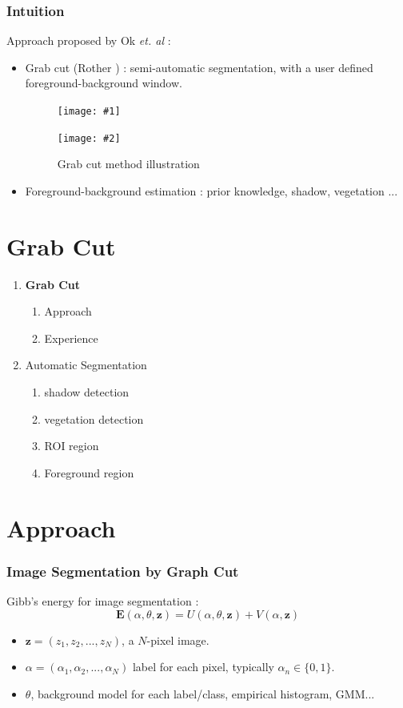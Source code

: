 \documentclass[compress]{beamer} %
\newcommand{\insertTwoF}[4]{
  \begin{figure}[h!]
    \centering
    \begin{minipage}{#4\linewidth}
    \texttt{[image: \#1]}
    \end{minipage}
    \begin{minipage}{#4\linewidth}
    \texttt{[image: \#2]}
    \end{minipage}
      \caption{#3}
  \end{figure}  
}
\newcommand{\bfE}{\mathbf{E}}
\newcommand{\bfz}{\mathbf{z}}
\begin{document}
 \begin{frame}
  \frametitle{Intuition}
  Approach proposed by Ok {\textit{et. al}} \cite{Ok:2013} : 
  \begin{itemize}
   \item Grab cut (Rother \cite{Rother:2004}) : semi-automatic segmentation, with a user defined foreground-background window.
   \insertTwoF{grab_cut}{grab_cut_result}{Grab cut method illustration}{0.45}
   \item Foreground-background estimation : prior knowledge, shadow, vegetation ...
  \end{itemize}
 \end{frame}

 \section{Grab Cut}
 \begin{frame}
  \scriptsize
  {
  \begin{enumerate}
  \item \textbf{Grab Cut} 
    \begin{enumerate}
     \item Approach
     \item Experience
    \end{enumerate}
  \item Automatic Segmentation
    \begin{enumerate}
     \item shadow detection
     \item vegetation detection
     \item ROI region
     \item Foreground region
    \end{enumerate}
  \end{enumerate}
  }
 \end{frame}  
 
 \section{Approach}
 \begin{frame}
  \frametitle{Image Segmentation by Graph Cut}
  Gibb's energy for image segmentation :
  \[
  \bfE(\alpha,\theta,\bfz)=U(\alpha,\theta,\bfz)+V(\alpha,\bfz)
  \]
  \begin{itemize}
   \item<1> $\bfz=(z_1,z_2,...,z_N)$, a $N$-pixel image.
   \item<1> $\alpha=(\alpha_1,\alpha_2,...,\alpha_N)$ label for each pixel, typically $\alpha_n\in\{0,1\}$.
   \item<1> $\theta$, background model for each label/class, empirical histogram, GMM...
  \end{itemize}
 \end{frame}
\end{document}
